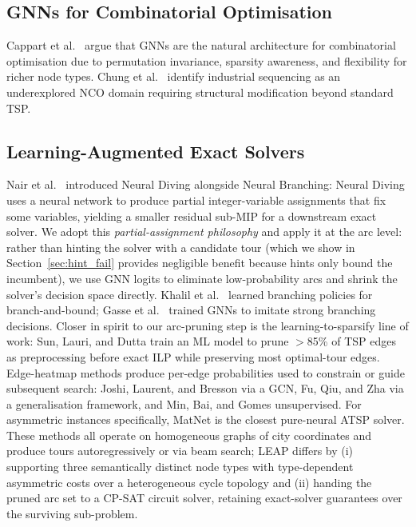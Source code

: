 \documentclass[conference]{IEEEtran}
\begin{document}
\subsection{GNNs for Combinatorial Optimisation}

Cappart et al.\ \cite{cappart2023gnnco} argue that GNNs are the natural architecture for combinatorial optimisation due to permutation invariance, sparsity awareness, and flexibility for richer node types. Chung et al.\ \cite{chung2025ncosurvey} identify industrial sequencing as an underexplored NCO domain requiring structural modification beyond standard TSP.

\subsection{Learning-Augmented Exact Solvers}

Nair et al.\ \cite{nair2021neural} introduced Neural Diving alongside Neural Branching: Neural Diving uses a neural network to produce partial integer-variable assignments that fix some variables, yielding a smaller residual sub-MIP for a downstream exact solver. We adopt this \emph{partial-assignment philosophy} and apply it at the arc level: rather than hinting the solver with a candidate tour (which we show in Section~\ref{sec:hint_fail} provides negligible benefit because hints only bound the incumbent), we use GNN logits to eliminate low-probability arcs and shrink the solver's decision space directly. Khalil et al.\ \cite{khalil2016learning} learned branching policies for branch-and-bound; Gasse et al.\ \cite{gasse2019exact} trained GNNs to imitate strong branching decisions. Closer in spirit to our arc-pruning step is the learning-to-sparsify line of work: Sun, Lauri, and Dutta \cite{sun2021sparsify} train an ML model to prune $>$85\% of TSP edges as preprocessing before exact ILP while preserving most optimal-tour edges. Edge-heatmap methods produce per-edge probabilities used to constrain or guide subsequent search: Joshi, Laurent, and Bresson \cite{joshi2019gcntsp} via a GCN, Fu, Qiu, and Zha \cite{fu2021gentsp} via a generalisation framework, and Min, Bai, and Gomes \cite{min2023utsp} unsupervised. For asymmetric instances specifically, MatNet \cite{kwon2021matnet} is the closest pure-neural ATSP solver. These methods all operate on homogeneous graphs of city coordinates and produce tours autoregressively or via beam search; LEAP differs by (i) supporting three semantically distinct node types with type-dependent asymmetric costs over a heterogeneous cycle topology and (ii) handing the pruned arc set to a CP-SAT circuit solver, retaining exact-solver guarantees over the surviving sub-problem.
\end{document}
